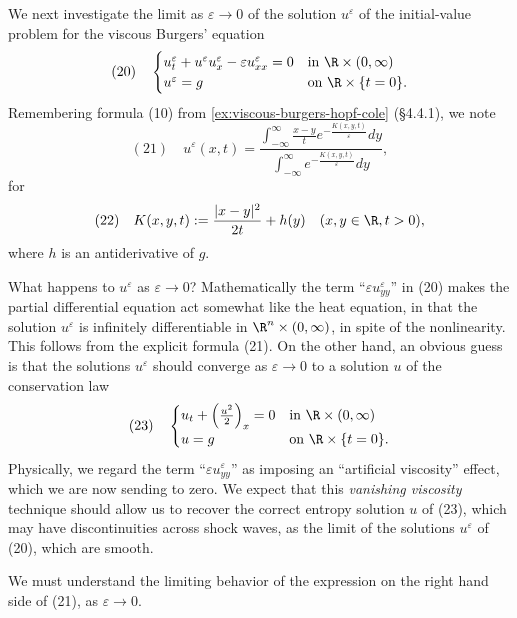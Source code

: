 \begin{example}
\label{ex:vanishing-viscosity-burgers}
We next investigate the limit as $\varepsilon \to 0$ of the solution $u^{\varepsilon}$ of the initial-value problem for the viscous Burgers' equation
$$(20) \quad \begin{cases} u_t^{\varepsilon} + u^{\varepsilon} u_x^{\varepsilon} - \varepsilon u_{xx}^{\varepsilon} = 0 & \text{in } \R \times (0, \infty) \\ u^{\varepsilon} = g & \text{on } \R \times \{t = 0\}. \end{cases}$$
Remembering formula (10) from \cref{ex:viscous-burgers-hopf-cole} (\S4.4.1), we note
$$(21) \quad u^{\varepsilon}(x,t) = \frac{\int_{-\infty}^{\infty} \frac{x-y}{t} e^{-\frac{K(x,y,t)}{\varepsilon}} dy}{\int_{-\infty}^{\infty} e^{-\frac{K(x,y,t)}{\varepsilon}} dy},$$
for
$$(22) \quad K(x,y,t) := \frac{|x - y|^2}{2t} + h(y) \quad (x,y \in \R, t > 0),$$
where $h$ is an antiderivative of $g$.

What happens to $u^{\varepsilon}$ as $\varepsilon \to 0$? Mathematically the term ``$\varepsilon u^{\varepsilon}_{yy}$'' in (20) makes the partial differential equation act somewhat like the heat equation, in that the solution $u^{\varepsilon}$ is infinitely differentiable in $\R^n \times (0, \infty)$, in spite of the nonlinearity. This follows from the explicit formula (21). On the other hand, an obvious guess is that the solutions $u^{\varepsilon}$ should converge as $\varepsilon \to 0$ to a solution $u$ of the conservation law
$$(23) \quad \begin{cases} u_t + \left(\frac{u^2}{2}\right)_x = 0 & \text{in } \R \times (0,\infty) \\ u = g & \text{on } \R \times \{t = 0\}. \end{cases}$$
Physically, we regard the term ``$\varepsilon u^{\varepsilon}_{yy}$'' as imposing an ``artificial viscosity'' effect, which we are now sending to zero. We expect that this \textit{vanishing viscosity} technique should allow us to recover the correct entropy solution $u$ of (23), which may have discontinuities across shock waves, as the limit of the solutions $u^{\varepsilon}$ of (20), which are smooth.

We must understand the limiting behavior of the expression on the right hand side of (21), as $\varepsilon \to 0$.


\end{example}
